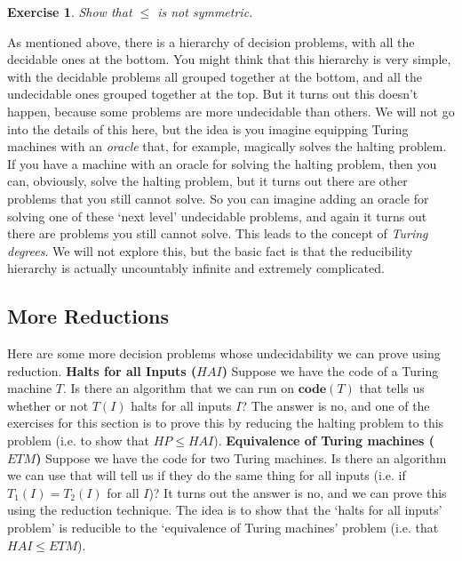 \documentclass{article}
\theoremstyle{plain}
\newtheorem{exercise}[theorem]{Exercise}{\bfseries}{\upshape}
\theoremstyle{definition}
\newcommand{\co}{\mathbf{code}}
\begin{document}
\begin{exercise}
Show that $\leq$ is not symmetric.
\end{exercise}

As mentioned above, there is a hierarchy of decision problems, with all the decidable ones at the bottom. You might think that this hierarchy is very simple, with the decidable problems all grouped together at the bottom, and all the undecidable ones grouped together at the top. But it turns out this doesn't happen, because some problems are more undecidable than others. We will not go into the details of this here, but the idea is you imagine equipping Turing machines with an \emph{oracle} that, for example, magically solves the halting problem. If you have a machine with an oracle for solving the halting problem, then you can, obviously, solve the halting problem, but it turns out there are other problems that you still cannot solve. So you can imagine adding an oracle for solving one of these `next level' undecidable problems, and again it turns out there are problems you still cannot solve. This leads to the concept of \emph{Turing degrees}. We will not explore this, but the basic fact is that the reducibility hierarchy is actually uncountably infinite and extremely complicated.  

\subsection{More Reductions}
Here are some more decision problems whose undecidability we can prove using reduction.\newline\newline
\textbf{Halts for all Inputs ($HAI$)}\newline 
Suppose we have the code of a Turing machine $T$. Is there an algorithm that we can run on $\co(T)$ that tells us whether or not $T(I)$ halts for all inputs $I$? The answer is no, and one of the exercises for this section is to prove this by reducing the halting problem to this problem (i.e. to show that $HP\leq HAI$).\newline\newline
\textbf{Equivalence of Turing machines ($ETM$)}\newline
Suppose we have the code for two Turing machines. Is there an algorithm we can use that will tell us if they do the same thing for all inputs (i.e. if $T_1(I)=T_2(I)$ for all $I$)? It turns out the answer is no, and we can prove this using the reduction technique. The idea is to show that the `halts for all inputs' problem' is reducible to the `equivalence of Turing machines' problem (i.e. that $HAI\leq ETM$).
\end{document}
